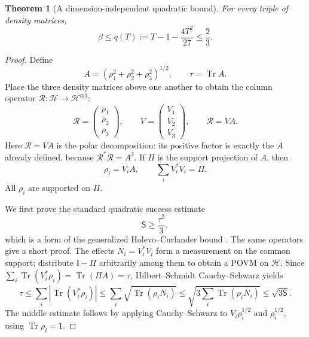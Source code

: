\documentclass[10pt,a4paper]{amsart}
\newtheorem{theorem}{Theorem}[section]
\newcommand{\Tr}{\operatorname{Tr}}
\newcommand{\id}{\mathbb I}
\newcommand{\1}{\mathbf 1}
\newcommand{\Sopt}{\mathsf S}
\begin{document}
\begin{theorem}[A dimension-independent quadratic bound]\label{thm:two-thirds}
For every triple of density matrices,
\begin{equation}\label{eq:quadratic-bound}
 \beta\le q(T):=T-1-\frac{4T^2}{27}\le\frac23.
\end{equation}
\end{theorem}
\begin{proof}
Define
\[
 A=(\rho_1^2+\rho_2^2+\rho_3^2)^{1/2},\qquad\tau=\Tr A.
\]
Place the three density matrices above one another to obtain the column
operator $\mathcal R:\mathcal H\to\mathcal H^{\oplus3}$:
\begin{equation}\label{eq:column}
 \mathcal R=\begin{pmatrix}\rho_1\\\rho_2\\\rho_3\end{pmatrix},
 \qquad V=\begin{pmatrix}V_1\\V_2\\V_3\end{pmatrix},
 \qquad\mathcal R=VA.
\end{equation}
Here $\mathcal R=VA$ is the polar decomposition: its positive factor is exactly
the $A$ already defined, because $\mathcal R^*\mathcal R=A^2$. If $\Pi$ is the
support projection of $A$, then
\begin{equation}\label{eq:polar-identities}
 \rho_i=V_iA,\qquad\sum_iV_i^*V_i=\Pi.
\end{equation}
All $\rho_i$ are supported on $\Pi$.

We first prove the standard quadratic success estimate
\begin{equation}\label{eq:HC}
 \Sopt\ge\frac{\tau^2}{3},
\end{equation}
which is a form of the generalized Holevo--Curlander bound
\cite{Tyson2009}. The same operators give a short proof. The effects
$N_i=V_i^*V_i$ form a measurement on the common support; distribute
$\id-\Pi$ arbitrarily among them to obtain a POVM on $\mathcal H$.
Since $\sum_i\Tr(V_i^*\rho_i)=\Tr(\Pi A)=\tau$, Hilbert--Schmidt
Cauchy--Schwarz yields
\[
 \tau\le\sum_i|\Tr(V_i^*\rho_i)|
 \le\sum_i\sqrt{\Tr(\rho_iN_i)}
 \le\sqrt{3\sum_i\Tr(\rho_iN_i)}\le\sqrt{3\Sopt}.
\]
The middle estimate follows by applying Cauchy--Schwarz to
$V_i\rho_i^{1/2}$ and $\rho_i^{1/2}$, using $\Tr\rho_i=1$.


\end{proof}
\end{document}
